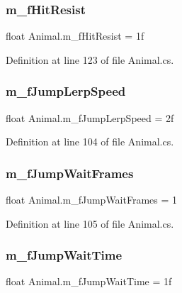 \subsubsection{\texorpdfstring{m\+\_\+f\+Hit\+Resist}{m\_fHitResist}}
{\footnotesize\ttfamily float Animal.\+m\+\_\+f\+Hit\+Resist = 1f}



Definition at line 123 of file Animal.\+cs.

\mbox{\label{class_animal_a577330859c3a5bf5b0ae5690eb03dc3b}} 
\subsubsection{\texorpdfstring{m\+\_\+f\+Jump\+Lerp\+Speed}{m\_fJumpLerpSpeed}}
{\footnotesize\ttfamily float Animal.\+m\+\_\+f\+Jump\+Lerp\+Speed = 2f}



Definition at line 104 of file Animal.\+cs.

\mbox{\label{class_animal_aa644cc3baee4917c5a8ff4ce6a7f5213}} 
\subsubsection{\texorpdfstring{m\+\_\+f\+Jump\+Wait\+Frames}{m\_fJumpWaitFrames}}
{\footnotesize\ttfamily float Animal.\+m\+\_\+f\+Jump\+Wait\+Frames = 1}



Definition at line 105 of file Animal.\+cs.

\mbox{\label{class_animal_a62e54a6e632478daff40256ce4d3fbd5}} 
\subsubsection{\texorpdfstring{m\+\_\+f\+Jump\+Wait\+Time}{m\_fJumpWaitTime}}
{\footnotesize\ttfamily float Animal.\+m\+\_\+f\+Jump\+Wait\+Time = 1f}



